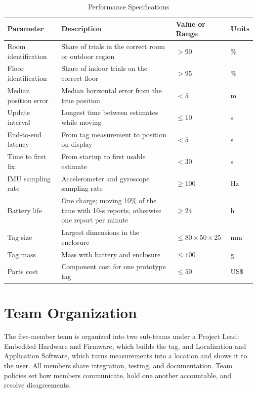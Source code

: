 \documentclass[12pt,letterpaper]{article}
\newenvironment{spectable}{\setstretch{1.0}\renewcommand{\arraystretch}{1.1}}{}
\begin{document}
\begin{table}[!htb]
\caption{Performance Specifications}
\label{tab:perf}
\centering
\begin{spectable}
\begin{tabularx}{\linewidth}{@{}L{1.55in} Y L{0.95in} L{0.5in}@{}}
\toprule
\textbf{Parameter} & \textbf{Description} & \textbf{Value or Range} & \textbf{Units} \\
\midrule
Room identification & Share of trials in the correct room or outdoor region & $>90$ & \% \\
Floor identification & Share of indoor trials on the correct floor & $>95$ & \% \\
Median position error & Median horizontal error from the true position & $<5$ & m \\
Update interval & Longest time between estimates while moving & $\leq 10$ & s \\
End-to-end latency & From tag measurement to position on display & $<5$ & s \\
Time to first fix & From startup to first usable estimate & $<30$ & s \\
IMU sampling rate & Accelerometer and gyroscope sampling rate & $\geq 100$ & Hz \\
Battery life & One charge; moving 10\% of the time with 10-s reports, otherwise one report per minute & $\geq 24$ & h \\
Tag size & Largest dimensions in the enclosure & $\leq 80 \times 50 \times 25$ & mm \\
Tag mass & Mass with battery and enclosure & $\leq 100$ & g \\
Parts cost & Component cost for one prototype tag & $\leq 50$ & US\$ \\
\bottomrule
\end{tabularx}
\end{spectable}
\end{table}

\section{Team Organization}
The five-member team is organized into two sub-teams under a Project Lead: Embedded Hardware and
Firmware, which builds the tag, and Localization and Application Software, which turns measurements
into a location and shows it to the user. All members share integration, testing, and
documentation. Team policies set how members communicate, hold one another accountable, and resolve
disagreements.
\end{document}

